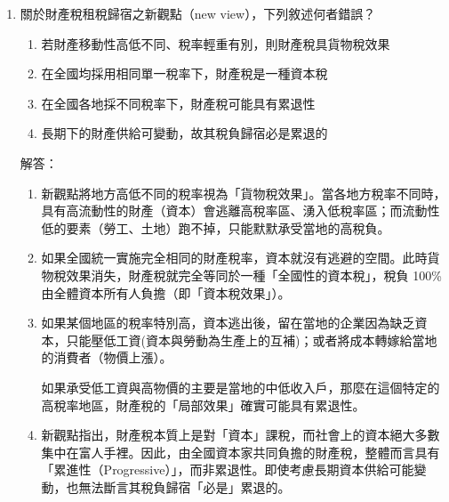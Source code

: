 \documentclass[12pt, a4paper]{article}
\begin{document}
\begin{enumerate}
    B 為正確敘述：
    \begin{itemize}
        \item 資本稅效果： 新觀點認為，全國平均水準的財產稅，本質上就是一種「對全國資本課徵的普通稅」。因為全國都在課稅，資本無處可逃，所以這部分的稅負將由全國的資本所有權人共同負擔（導致全國資本報酬率下降）。
        \item 貨物稅效果（地區差異）： 如果某個地區的財產稅率「高於」全國平均，因為資本是會流動的，資本就會逃離這個高稅率地區。資本抽走後，該地區留下來的「不流動要素」（例如：土地、當地的勞工）的生產力就會下降，導致地租與工資下跌。因此，在高稅率地區，相對較不流動的生產要素最終會被迫負擔較重的稅負。
    \end{itemize}
    A、C、D 為錯誤敘述：這三個選項描述的全部都是「傳統觀點」的核心主張。傳統觀點採用部分均衡分析，把它當作一般的貨物稅，認為對土地的稅由地主負擔（A），對建築物的稅會轉嫁給需求者/租客負擔（C），且負擔比例視雙方的供需彈性而定（D）。

    \item 關於財產稅租稅歸宿之新觀點（new view），下列敘述何者錯誤？
    \begin{enumerate}[label=\Alph*.]
        \item 若財產移動性高低不同、稅率輕重有別，則財產稅具貨物稅效果
        \item 在全國均採用相同單一稅率下，財產稅是一種資本稅
        \item 在全國各地採不同稅率下，財產稅可能具有累退性
        \item 長期下的財產供給可變動，故其稅負歸宿必是累退的
    \end{enumerate}
    解答：
    \begin{enumerate}[label=\Alph*.]
        \item 新觀點將地方高低不同的稅率視為「貨物稅效果」。當各地方稅率不同時，具有高流動性的財產（資本）會逃離高稅率區、湧入低稅率區；而流動性低的要素（勞工、土地）跑不掉，只能默默承受當地的高稅負。
        \item 如果全國統一實施完全相同的財產稅率，資本就沒有逃避的空間。此時貨物稅效果消失，財產稅就完全等同於一種「全國性的資本稅」，稅負 100\% 由全體資本所有人負擔（即「資本稅效果」）。
        \item 如果某個地區的稅率特別高，資本逃出後，留在當地的企業因為缺乏資本，只能壓低工資(資本與勞動為生產上的互補)；或者將成本轉嫁給當地的消費者（物價上漲）。

        如果承受低工資與高物價的主要是當地的中低收入戶，那麼在這個特定的高稅率地區，財產稅的「局部效果」確實可能具有累退性。
        \item 新觀點指出，財產稅本質上是對「資本」課稅，而社會上的資本絕大多數集中在富人手裡。因此，由全國資本家共同負擔的財產稅，整體而言具有「累進性（Progressive）」，而非累退性。即使考慮長期資本供給可能變動，也無法斷言其稅負歸宿「必是」累退的。
    \end{enumerate}


\end{enumerate}
\end{document}
